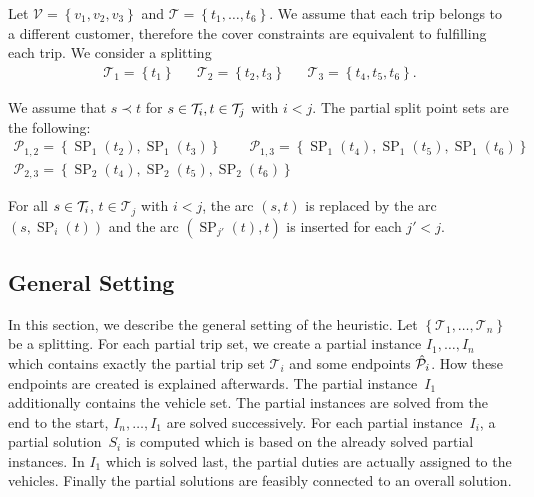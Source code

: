 \begin{example}
\label{ex:splitting_1}

Let ${\mathcal{V}=\left\{v_1,v_2,v_3\right\}}$ and ${\mathcal{T}=\left\{t_1,\dots,t_6\right\}}$. We assume that each trip belongs to a different customer, therefore the cover constraints are equivalent to fulfilling each trip. We consider a splitting
\begin{align*}
	\mathcal{T}_1=\left\{t_1\right\} && \mathcal{T}_2=\left\{t_2,t_3\right\} && \mathcal{T}_3=\left\{t_4,t_5,t_6\right\}.
\end{align*}

We assume that ${s\prec t}$ for ${s\in\mathcal{T}_i}, {t\in\mathcal{T}_j}$ with ${i<j}$. The partial split point sets are the following:
\begin{gather*}
	\mathcal{P}_{1,2} = \left\{\operatorname{SP}_1\left(t_2\right), \operatorname{SP}_1\left(t_3\right)\right\}
	\qquad \mathcal{P}_{1,3} = \left\{\operatorname{SP}_1\left(t_4\right),\operatorname{SP}_1\left(t_5\right),\operatorname{SP}_1\left(t_6\right)\right\} \\
	\mathcal{P}_{2,3} = \left\{\operatorname{SP}_2\left(t_4\right),\operatorname{SP}_2\left(t_5\right),\operatorname{SP}_2\left(t_6\right)\right\}
\end{gather*}

For all ${s\in\mathcal{T}_i}$, ${t\in\mathcal{T}_j}$ with ${i<j}$, the arc $(s,t)$ is replaced by the arc $\left(s,\operatorname{SP}_i(t)\right)$ and the arc $\left(\operatorname{SP}_{j'}(t),t\right)$ is inserted for each ${j'<j}$.

\end{example}


\subsection{General Setting}
\label{sec:general_setting}

In this section, we describe the general setting of the heuristic. Let $\left\{\mathcal{T}_1,\dots,\mathcal{T}_n\right\}$ be a splitting. For each partial trip set, we create a partial instance ${I_1,\dots,I_n}$ which contains exactly the partial trip set $\mathcal{T}_i$ and some endpoints $\hat{\mathcal{P}}_i$. How these endpoints are created is explained afterwards. The partial instance~$I_1$ additionally contains the vehicle set. The partial instances are solved from the end to the start, \ie ${I_n,\dots,I_1}$ are solved successively. For each partial instance~$I_i$, a partial solution~$S_i$ is computed which is based on the already solved partial instances. In $I_1$ which is solved last, the partial duties are actually assigned to the vehicles. Finally the partial solutions are feasibly connected to an overall solution.

